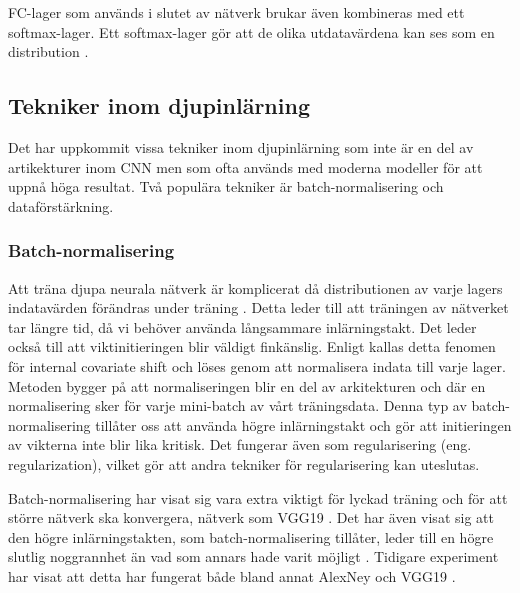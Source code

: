 \documentclass[]{kththesis}
\begin{document}
FC-lager som används i slutet av nätverk brukar även kombineras med ett softmax-lager. Ett softmax-lager gör att de olika utdatavärdena kan ses som en distribution \parencite{Goodfellow-et-al-2016}.

\subsection{Tekniker inom djupinlärning}
Det har uppkommit vissa tekniker inom djupinlärning som inte är en del av artikekturer inom CNN men som ofta används med moderna modeller för att uppnå höga resultat. Två populära tekniker är batch-normalisering och dataförstärkning.

\subsubsection{Batch-normalisering}
Att träna djupa neurala nätverk är komplicerat då distributionen av varje lagers indatavärden förändras under träning \parencite{ioffe2015batch}. Detta leder till att träningen av nätverket tar längre tid, då vi behöver använda långsammare inlärningstakt. Det leder också till att viktinitieringen blir väldigt finkänslig. Enligt \textcite{ioffe2015batch} kallas detta fenomen för internal covariate shift och löses genom att normalisera indata till varje lager. Metoden bygger på att normaliseringen blir en del av arkitekturen och där en normalisering sker för varje mini-batch av vårt träningsdata. Denna typ av batch-normalisering tillåter oss att använda högre inlärningstakt och gör att initieringen av vikterna inte blir lika kritisk. Det fungerar även som regularisering (eng. regularization), vilket gör att andra tekniker för regularisering kan uteslutas.

Batch-normalisering har visat sig vara extra viktigt för lyckad träning och för att större nätverk ska konvergera, nätverk som VGG19 \parencite{simon2016imagenet}. Det har även visat sig att den högre inlärningstakten, som batch-normalisering tillåter, leder till en högre slutlig noggrannhet än vad som annars hade varit möjligt \parencite{simon2016imagenet}. Tidigare experiment har visat att detta har fungerat både bland annat AlexNey och VGG19 \parencite{simon2016imagenet}.
\end{document}
